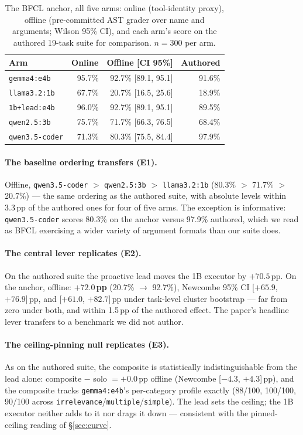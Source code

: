 \documentclass[smallcondensed,natbib]{svjour3}
\begin{document}
\begin{table}[t]
\centering\small
\caption{The BFCL anchor, all five arms: online (tool-identity
proxy), offline (pre-committed AST grader over name and arguments;
Wilson 95\% CI), and each arm's score on the authored 19-task suite
for comparison. $n{=}300$ per arm.}
\label{tab:bfcl}
\begin{tabular}{lrrr}
\toprule
Arm & Online & Offline [CI 95\%] & Authored \\
\midrule
\texttt{gemma4:e4b} & 95.7\% & 92.7\% [89.1, 95.1] & 91.6\% \\
\texttt{llama3.2:1b} & 67.7\% & 20.7\% [16.5, 25.6] & 18.9\% \\
\texttt{1b+lead:e4b} & 96.0\% & 92.7\% [89.1, 95.1] & 89.5\% \\
\texttt{qwen2.5:3b} & 75.7\% & 71.7\% [66.3, 76.5] & 68.4\% \\
\texttt{qwen3.5-coder} & 71.3\% & 80.3\% [75.5, 84.4] & 97.9\% \\
\bottomrule
\end{tabular}
\end{table}

\paragraph{The baseline ordering transfers (E1).} Offline,
\texttt{qwen3.5-coder} $>$ \texttt{qwen2.5:3b} $>$
\texttt{llama3.2:1b} (80.3\% $>$ 71.7\% $>$ 20.7\%) --- the same
ordering as the authored suite, with absolute levels within
3.3\,pp of the authored ones for four of five arms. The exception is
informative: \texttt{qwen3.5-coder} scores 80.3\% on the anchor
versus 97.9\% authored, which we read as BFCL exercising a wider
variety of argument formats than our suite does.

\paragraph{The central lever replicates (E2).} On the authored suite
the proactive lead moves the 1B executor by $+70.5$\,pp. On the
anchor, offline: \textbf{$+72.0$\,pp} (20.7\% $\to$ 92.7\%), Newcombe
95\% CI [$+65.9$, $+76.9$]\,pp, and [$+61.0$, $+82.7$]\,pp under
task-level cluster bootstrap --- far from zero under both, and
within 1.5\,pp of the authored effect. The paper's headline lever
transfers to a benchmark we did not author.

\paragraph{The ceiling-pinning null replicates (E3).} As on the
authored suite, the composite is statistically indistinguishable from
the lead alone: composite $-$ solo $= +0.0$\,pp offline (Newcombe
[$-4.3$, $+4.3$]\,pp), and the composite tracks \texttt{gemma4:e4b}'s
per-category profile exactly (88/100, 100/100, 90/100 across
\texttt{irrelevance}/\texttt{multiple}/\texttt{simple}). The lead
sets the ceiling; the 1B executor neither adds to it nor drags it
down --- consistent with the pinned-ceiling reading of
\S\ref{sec:curve}.
\end{document}
